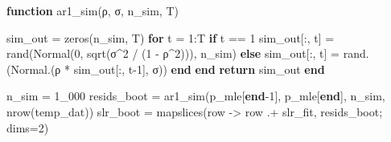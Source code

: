 \documentclass[
  letterpaper,
  DIV=11,
  numbers=noendperiod]{scrartcl}
\newenvironment{Shaded}{\begin{snugshade}}{\end{snugshade}}
\newcommand{\ControlFlowTok}[1]{\textcolor[rgb]{0.00,0.23,0.31}{\textbf{#1}}}
\newcommand{\FloatTok}[1]{\textcolor[rgb]{0.68,0.00,0.00}{#1}}
\newcommand{\FunctionTok}[1]{\textcolor[rgb]{0.28,0.35,0.67}{#1}}
\newcommand{\KeywordTok}[1]{\textcolor[rgb]{0.00,0.23,0.31}{\textbf{#1}}}
\newcommand{\NormalTok}[1]{\textcolor[rgb]{0.00,0.23,0.31}{#1}}
\newcommand{\OperatorTok}[1]{\textcolor[rgb]{0.37,0.37,0.37}{#1}}
\begin{document}
\begin{Shaded}
\begin{Highlighting}[]
\KeywordTok{function} \FunctionTok{ar1\_sim}\NormalTok{(ρ, σ, n\_sim, T)}

\NormalTok{    sim\_out }\OperatorTok{=} \FunctionTok{zeros}\NormalTok{(n\_sim, T)}
    \ControlFlowTok{for}\NormalTok{ t }\OperatorTok{=} \FloatTok{1}\OperatorTok{:}\NormalTok{T}
        \ControlFlowTok{if}\NormalTok{ t }\OperatorTok{==} \FloatTok{1}
\NormalTok{            sim\_out[}\OperatorTok{:}\NormalTok{, t] }\OperatorTok{=} \FunctionTok{rand}\NormalTok{(}\FunctionTok{Normal}\NormalTok{(}\FloatTok{0}\NormalTok{, }\FunctionTok{sqrt}\NormalTok{(σ}\OperatorTok{\^{}}\FloatTok{2} \OperatorTok{/}\NormalTok{ (}\FloatTok{1} \OperatorTok{{-}}\NormalTok{ ρ}\OperatorTok{\^{}}\FloatTok{2}\NormalTok{))), n\_sim)}
        \ControlFlowTok{else}
\NormalTok{            sim\_out[}\OperatorTok{:}\NormalTok{, t] }\OperatorTok{=} \FunctionTok{rand}\NormalTok{.(}\FunctionTok{Normal}\NormalTok{.(ρ }\OperatorTok{*}\NormalTok{ sim\_out[}\OperatorTok{:}\NormalTok{, t}\OperatorTok{{-}}\FloatTok{1}\NormalTok{], σ))}
        \ControlFlowTok{end}
    \ControlFlowTok{end}
    \ControlFlowTok{return}\NormalTok{ sim\_out}
\KeywordTok{end}

\NormalTok{n\_sim }\OperatorTok{=} \FloatTok{1\_000}
\NormalTok{resids\_boot }\OperatorTok{=} \FunctionTok{ar1\_sim}\NormalTok{(p\_mle[}\KeywordTok{end}\OperatorTok{{-}}\FloatTok{1}\NormalTok{], p\_mle[}\KeywordTok{end}\NormalTok{], n\_sim, }\FunctionTok{nrow}\NormalTok{(temp\_dat))}
\NormalTok{slr\_boot }\OperatorTok{=} \FunctionTok{mapslices}\NormalTok{(row }\OperatorTok{{-}\textgreater{}}\NormalTok{ row }\OperatorTok{.+}\NormalTok{ slr\_fit, resids\_boot; dims}\OperatorTok{=}\FloatTok{2}\NormalTok{)}
\end{Highlighting}
\end{Shaded}
\end{document}
